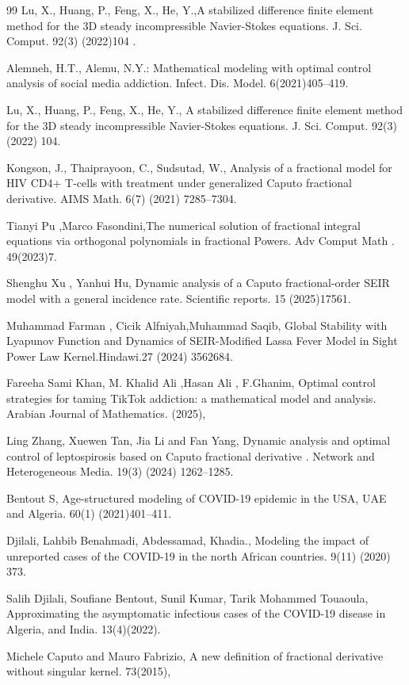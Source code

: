 \documentclass[10pt]{NSP1}
\begin{document}
\begin{thebibliography}{99}
		Lu, X., Huang, P., Feng, X., He, Y.,A stabilized difference finite element method for the 3D steady incompressible Navier-Stokes equations. J. Sci. Comput. 92(3) (2022)104 .
		
		Alemneh, H.T., Alemu, N.Y.: Mathematical modeling with optimal control analysis of social media addiction. Infect. Dis. Model. 6(2021)405–419.
		
		Lu, X., Huang, P., Feng, X., He, Y., A stabilized difference finite element method for the 3D steady incompressible Navier-Stokes equations. J. Sci. Comput. 92(3) (2022) 104.
		
		Kongson, J., Thaiprayoon, C., Sudsutad, W., Analysis of a fractional model for HIV CD4+ T-cells with treatment under generalized Caputo fractional derivative. AIMS Math. 6(7) (2021) 7285–7304.
		
		Tianyi Pu ,Marco Fasondini,The numerical solution of fractional integral equations via orthogonal polynomials in fractional Powers. Adv Comput Math . 49(2023)7.
		
		Shenghu Xu , Yanhui Hu, Dynamic analysis of a Caputo fractional-order SEIR model with a general incidence rate. Scientific reports. 15 (2025)17561.
		
		Muhammad Farman , Cicik Alfniyah,Muhammad Saqib, Global Stability with Lyapunov Function and Dynamics of SEIR-Modified Lassa Fever Model in Sight Power Law Kernel.Hindawi.27 (2024) 3562684.
		
		Fareeha Sami Khan, M. Khalid Ali ,Hasan Ali , F.Ghanim, Optimal control strategies for taming TikTok addiction: a mathematical model and analysis. Arabian Journal of Mathematics. (2025),
		
		Ling Zhang, Xuewen Tan, Jia Li and Fan Yang, Dynamic analysis and optimal control of leptospirosis based on Caputo fractional derivative . Network and Heterogeneous Media. 19(3) (2024) 1262–1285.
		
		Bentout S, Age-structured modeling of COVID-19 epidemic in the USA, UAE and Algeria. 60(1) (2021)401–411.
		
		Djilali, Lahbib Benahmadi, Abdessamad, Khadia., Modeling the impact of unreported cases of the COVID-19 in the north African countries. 9(11) (2020) 373.
		
		Salih Djilali, Soufiane Bentout, Sunil Kumar, Tarik Mohammed Touaoula, Approximating the asymptomatic infectious cases of the COVID-19 disease in Algeria, and India. 13(4)(2022).
		
		Michele Caputo and Mauro Fabrizio, A new definition of fractional derivative without singular kernel. 73(2015),
		
	\end{thebibliography}
	
\end{document}
